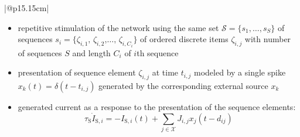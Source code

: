 \documentclass[10pt,a4paper,twoside,american]{article}
\newcommand{\seq}[1]{\ensuremath{\{\text{#1}\}}}
\newcommand{\EF}{{\exc\textnormal{F}}}
\newcommand{\exc}{\textnormal{E}}     %
\begin{document}
\begin{table}
\begin{tabular}{|@{\hspace*{1mm}}p{15.15cm}|}
  \\
    \begin{itemize}
      \item repetitive stimulation of the network using the same
        set $\mathcal{S}=\{s_1,\ldots,s_{S}\}$ of
        sequences $s_i=$\seq{$\zeta_{i,1}$, $\zeta_{i,2}$,\ldots, $\zeta_{i,C_i}$} of
        ordered discrete items $\zeta_{i,j}$ 
        with number of sequences $S$ and length $C_i$ of $i$th sequence
        \item presentation of sequence element $\zeta_{i,j}$ at time $t_{i,j}$ modeled by a single spike $x_k(t)=\delta(t-t_{i,j})$ generated by the corresponding external source $x_k$
        \item generated current as a response to the presentation of the sequence elements:
        \begin{equation}
          \tau_\text{S}\dot{I}_{\text{S},i} = -I_{\text{S},i}(t) + \sum_{j \in \mathcal{X}} J_{i,j} x_j(t-d_{ij})        
        \end{equation} 
    

\end{itemize}
\end{tabular}
\end{table}
\end{document}
